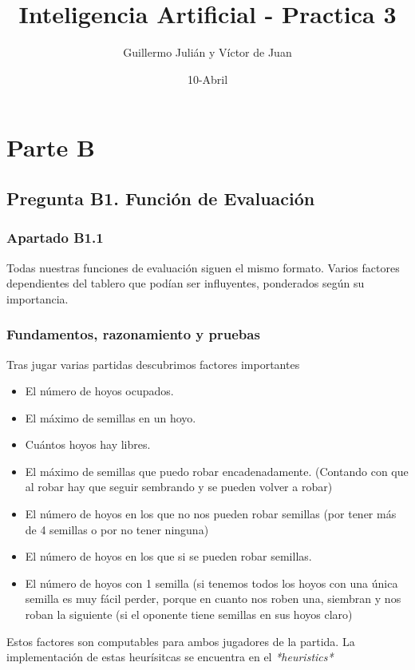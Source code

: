 \documentclass[nochap]{apuntes}
\author{Guillermo Julián y Víctor de Juan}
\date{10-Abril}
\title{Inteligencia Artificial - Practica 3}
\begin{document}
\maketitle

\section*{Parte B}
\subsection*{Pregunta B1. Función de Evaluación}
\subsubsection*{Apartado B1.1}

Todas nuestras funciones de evaluación siguen el mismo formato. Varios factores dependientes del tablero que podían ser influyentes, ponderados según su importancia.

\subsubsection*{Fundamentos, razonamiento y pruebas}
Tras jugar varias partidas descubrimos factores importantes

\begin{itemize}
\item El número de hoyos ocupados.
\item El máximo de semillas en un hoyo.
\item Cuántos hoyos hay libres.
\item El máximo de semillas que puedo robar encadenadamente. (Contando con que al robar hay que seguir sembrando y se pueden volver a robar)
\item El número de hoyos en los que no nos pueden robar semillas (por tener más de 4 semillas o por no tener ninguna)
\item El número de hoyos en los que si se pueden robar semillas.
\item El número de hoyos con 1 semilla (si tenemos todos los hoyos con una única semilla es muy fácil perder, porque en cuanto nos roben una, siembran y nos roban la siguiente (si el oponente tiene semillas en sus hoyos claro)
\end{itemize}

Estos factores son computables para ambos jugadores de la partida. La implementación de estas heurísitcas se encuentra en el \textit{*heuristics*}
\end{document}
